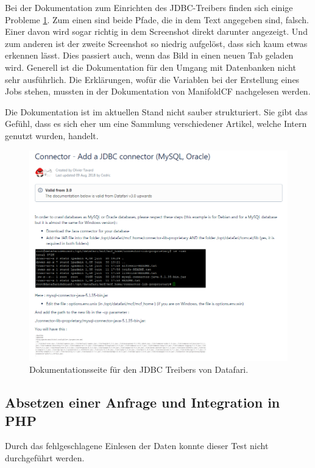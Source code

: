 Bei der Dokumentation zum Einrichten des JDBC-Treibers finden sich einige Probleme \ref{img:datafariJDBC}. Zum einen sind beide Pfade, die in dem Text angegeben sind, falsch. Einer davon wird sogar richtig in dem Screenshot direkt darunter angezeigt. Und zum anderen ist der zweite Screenshot so niedrig aufgelöst, dass sich kaum etwas erkennen lässt. Dies passiert auch, wenn das Bild in einen neuen Tab geladen wird. Generell ist die Dokumentation für den Umgang mit Datenbanken nicht sehr ausführlich. Die Erklärungen, wofür die Variablen bei der Erstellung eines Jobs stehen, mussten in der Dokumentation von ManifoldCF nachgelesen werden.

Die Dokumentation ist im aktuellen Stand nicht sauber strukturiert. Sie gibt das Gefühl, dass es sich eher um eine Sammlung verschiedener Artikel, welche Intern genutzt wurden, handelt.

\begin{figure}
	\centering
	\includegraphics[width=1\linewidth]{images/datafari_doku_wrong_path.png}
	\caption{Dokumentationsseite für den JDBC Treibers von Datafari.}
	\label{img:datafariJDBC}
\end{figure}


\subsection{Absetzen einer Anfrage und Integration in PHP}

Durch das fehlgeschlagene Einlesen der Daten konnte dieser Test nicht durchgeführt werden.
